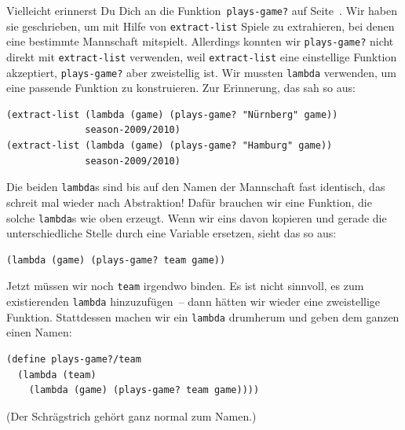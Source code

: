 Vielleicht erinnerst Du Dich an die Funktion~\lstinline{plays-game?}
auf Seite~\pageref{func:plays-game}.  Wir haben sie geschrieben, um
mit Hilfe von \lstinline{extract-list} Spiele zu extrahieren, bei
denen eine bestimmte Mannschaft mitspielt.  Allerdings konnten wir
\lstinline{plays-game?} nicht direkt mit \lstinline{extract-list}
verwenden, weil \lstinline{extract-list} eine einstellige Funktion
akzeptiert, \lstinline{plays-game?} aber zweistellig ist.  Wir mussten
\lstinline{lambda} verwenden, um eine passende Funktion zu
konstruieren.  Zur Erinnerung, das sah so aus:
%
\begin{lstlisting}
(extract-list (lambda (game) (plays-game? "Nürnberg" game)) 
              season-2009/2010)
(extract-list (lambda (game) (plays-game? "Hamburg" game)) 
              season-2009/2010)
\end{lstlisting}
%
Die beiden \lstinline{lambda}s sind bis auf den Namen der Mannschaft
fast identisch, das schreit mal wieder nach Abstraktion!  Dafür brauchen
wir eine Funktion, die solche \lstinline{lambda}s wie oben erzeugt.
Wenn wir eins davon kopieren und gerade die unterschiedliche Stelle
durch eine Variable ersetzen, sieht das so aus:
%
\begin{lstlisting}
(lambda (game) (plays-game? team game))
\end{lstlisting}
%
Jetzt müssen wir noch \lstinline{team} irgendwo binden.  Es ist nicht
sinnvoll, es zum existierenden \lstinline{lambda} hinzuzufügen~-- dann
hätten wir wieder eine zweistellige Funktion.  Stattdessen machen wir
ein \lstinline{lambda} drumherum und geben dem ganzen einen Namen:
%
\begin{lstlisting}
(define plays-game?/team
  (lambda (team)
    (lambda (game) (plays-game? team game))))
\end{lstlisting}
%
(Der Schrägstrich gehört ganz normal zum Namen.)


